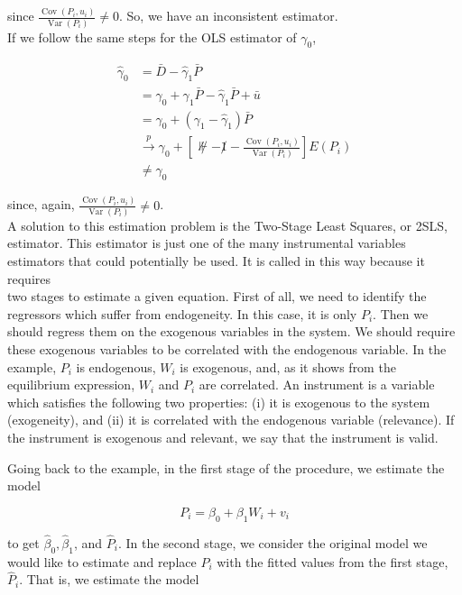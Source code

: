 since $\frac{\operatorname{Cov}\left(P_{i}, u_{i}\right)}{\operatorname{Var}\left(P_{i}\right)} \neq 0$. So, we have an inconsistent estimator.\\
If we follow the same steps for the OLS estimator of $\gamma_{0}$,

$$
\begin{aligned}
\widehat{\gamma}_{0} & =\bar{D}-\widehat{\gamma}_{1} \bar{P} \\
& =\gamma_{0}+\gamma_{1} \bar{P}-\widehat{\gamma}_{1} \bar{P}+\bar{u} \\
& =\gamma_{0}+\left(\gamma_{1}-\widehat{\gamma}_{1}\right) \bar{P} \\
& \stackrel{p}{\longrightarrow} \gamma_{0}+\left[\not \nVdash-\not 1-\frac{\operatorname{Cov}\left(P_{i}, u_{i}\right)}{\operatorname{Var}\left(P_{i}\right)}\right] E\left(P_{i}\right) \\
& \neq \gamma_{0}
\end{aligned}
$$

since, again, $\frac{\operatorname{Cov}\left(P_{i}, u_{i}\right)}{\operatorname{Var}\left(P_{i}\right)} \neq 0$.\\
A solution to this estimation problem is the Two-Stage Least Squares, or 2SLS, estimator. This estimator is just one of the many instrumental variables estimators that could potentially be used. It is called in this way because it requires\\
two stages to estimate a given equation. First of all, we need to identify the regressors which suffer from endogeneity. In this case, it is only $P_{i}$. Then we should regress them on the exogenous variables in the system. We should require these exogenous variables to be correlated with the endogenous variable. In the example, $P_{i}$ is endogenous, $W_{i}$ is exogenous, and, as it shows from the equilibrium expression, $W_{i}$ and $P_{i}$ are correlated. An instrument is a variable which satisfies the following two properties: (i) it is exogenous to the system (exogeneity), and (ii) it is correlated with the endogenous variable (relevance). If the instrument is exogenous and relevant, we say that the instrument is valid.

Going back to the example, in the first stage of the procedure, we estimate the model

$$
P_{i}=\beta_{0}+\beta_{1} W_{i}+v_{i}
$$

to get $\widehat{\beta}_{0}, \widehat{\beta}_{1}$, and $\widehat{P}_{i}$. In the second stage, we consider the original model we would like to estimate and replace $P_{i}$ with the fitted values from the first stage, $\widehat{P}_{i}$. That is, we estimate the model

